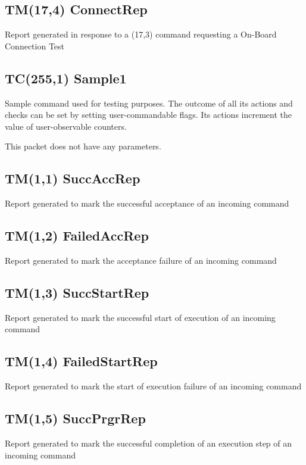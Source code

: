 \pagebreak
\subsection{TM(17,4) ConnectRep}
Report generated in response to a (17,3) command requesting a On-Board Connection Test

\pagebreak
\subsection{TC(255,1) Sample1}
Sample command used for testing purposes. The outcome of all its actions and checks can be set by setting user-commandable flags. Its actions increment the value of user-observable counters. 

This packet does not have any parameters.

\pagebreak
\subsection{TM(1,1) SuccAccRep}
Report generated to mark the successful acceptance of an incoming command

\pagebreak
\subsection{TM(1,2) FailedAccRep}
Report generated to mark the acceptance failure of an incoming command

\pagebreak
\subsection{TM(1,3) SuccStartRep}
Report generated to mark the successful start of execution of an incoming command

\pagebreak
\subsection{TM(1,4) FailedStartRep}
Report generated to mark the start of execution failure of an incoming command

\pagebreak
\subsection{TM(1,5) SuccPrgrRep}
Report generated to mark the successful completion of an execution step of an incoming command

